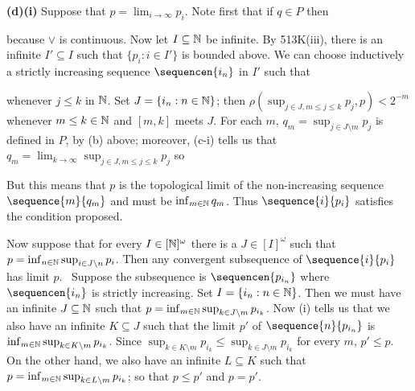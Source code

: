 {{\bf (d)(i)} Suppose that $p=\lim_{i\to\infty}p_i$.
Note first that if $q\in P$ then



\noindent because $\vee$ is continuous.   Now let $I\subseteq\Bbb N$ be
infinite.   By 513K(iii), there is an infinite $I'\subseteq I$ such that
$\{p_i:i\in I'\}$ is bounded above.
We can choose inductively a strictly increasing
sequence $\sequencen{i_n}$ in $I'$ such that


\noindent whenever $j\le k$ in $\Bbb N$.   Set $J=\{i_n:n\in\Bbb N\}$;
then $\rho(\sup_{j\in J,m\le j\le k}p_j,p)<2^{-m}$ whenever
$m\le k\in\Bbb N$ and $[m,k]$ meets $J$.   For each $m$,
$q_m=\sup_{j\in J\setminus m}p_j$ is
defined in $P$, by (b) above;  moreover, (c-i) tells us that
$q_m=\lim_{k\to\infty}\sup_{j\in J,m\le j\le k}p_j$ so


\noindent But this means that $p$ is the topological limit of the
non-increasing sequence $\sequence{m}{q_m}$ and must be
$\inf_{m\in\Bbb N}q_m$.  Thus $\sequence{i}{p_i}$ satisfies the
condition proposed.

\medskip

 Now suppose that for every $I\in[\Bbb N]^{\omega}$ there
is a $J\in[I]^{\omega}$ such that
$p=\inf_{n\in\Bbb N}\sup_{i\in J\setminus n}p_i$.
Then any convergent subsequence of $\sequence{i}{p_i}$ has limit $p$.
\Prf\ Suppose the subsequence is $\sequencen{p_{i_n}}$ where
$\sequencen{i_n}$ is strictly increasing.   Set $I=\{i_n:n\in\Bbb N\}$.
Then we must have an infinite $J\subseteq\Bbb N$ such that
$p=\inf_{m\in\Bbb N}\sup_{k\in J\setminus m}p_{i_k}$.   Now (i) tells us
that we also have an infinite $K\subseteq J$ such that the limit $p'$ of
$\sequence{n}{p_{i_n}}$ is
$\inf_{m\in\Bbb N}\sup_{k\in K\setminus m}p_{i_k}$.   Since
$\sup_{k\in K\setminus m}p_{i_k}\le\sup_{k\in J\setminus m}p_{i_k}$ for
every $m$, $p'\le p$.   On the other hand, we also have an infinite
$L\subseteq K$ such that
$p=\inf_{m\in\Bbb N}\sup_{k\in L\setminus m}p_{i_k}$;  so that
$p\le p'$ and $p=p'$.\ \Qed

}
